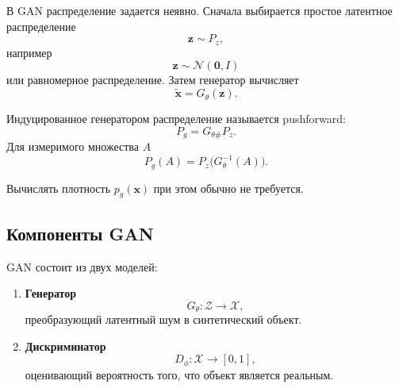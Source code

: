 \documentclass[12pt,a4paper]{article}
\numberwithin{equation}{section}
\theoremstyle{definition}
\theoremstyle{remark}
\begin{document}
В GAN распределение задается неявно. Сначала выбирается простое
латентное распределение
\[
    \bm{z}\sim P_z,
\]
например
\[
    \bm{z}\sim\mathcal{N}(\bm{0},I)
\]
или равномерное распределение. Затем генератор вычисляет
\[
    \widetilde{\bm{x}}=G_\theta(\bm{z}).
\]

Индуцированное генератором распределение называется pushforward:
\[
    P_g=G_{\theta\#}P_z.
\]
Для измеримого множества \(A\)
\[
    P_g(A)
    =
    P_z\bigl(G_\theta^{-1}(A)\bigr).
\]

Вычислять плотность \(p_g(\bm{x})\) при этом обычно не требуется.

\subsection{Компоненты GAN}

GAN состоит из двух моделей:

\begin{enumerate}
    \item \textbf{Генератор}
    \[
        G_\theta:\mathcal{Z}\to\mathcal{X},
    \]
    преобразующий латентный шум в синтетический объект.

    \item \textbf{Дискриминатор}
    \[
        D_\phi:\mathcal{X}\to[0,1],
    \]
    оценивающий вероятность того, что объект является реальным.
\end{enumerate}

\begin{center}
\end{center}
\end{document}
